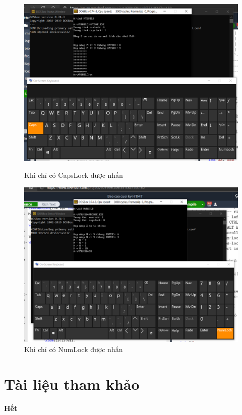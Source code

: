 \documentclass[12pt, final]{article}
\begin{document}
\begin{figure}[H]
\centering
\includegraphics[width=\textwidth]{image/capslock-only.png}
\caption{Khi chỉ có CapsLock được nhấn}
\includegraphics[width=\textwidth]{image/numlock-only.png}
\caption{Khi chỉ có NumLock được nhấn}
\end{figure}

\section{Tài liệu tham khảo}
\nocite{*}



\center\textbf{Hết}

\end{document}
